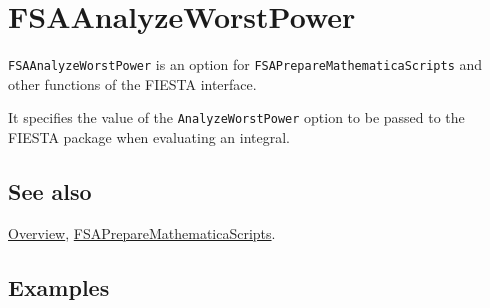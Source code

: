 \documentclass[../FeynHelpersManual.tex]{subfiles}
\begin{document}
\begin{Shaded}
\begin{Highlighting}[]
 
\end{Highlighting}
\end{Shaded}

\hypertarget{fsaanalyzeworstpower}{
\section{FSAAnalyzeWorstPower}\label{fsaanalyzeworstpower}}

\texttt{FSAAnalyzeWorstPower} is an option for
\texttt{FSAPrepareMathematicaScripts} and other functions of the FIESTA
interface.

It specifies the value of the \texttt{AnalyzeWorstPower} option to be
passed to the FIESTA package when evaluating an integral.

\subsection{See also}

\hyperlink{toc}{Overview},
\hyperlink{fsapreparemathematicascripts}{FSAPrepareMathematicaScripts}.

\subsection{Examples}
\end{document}
